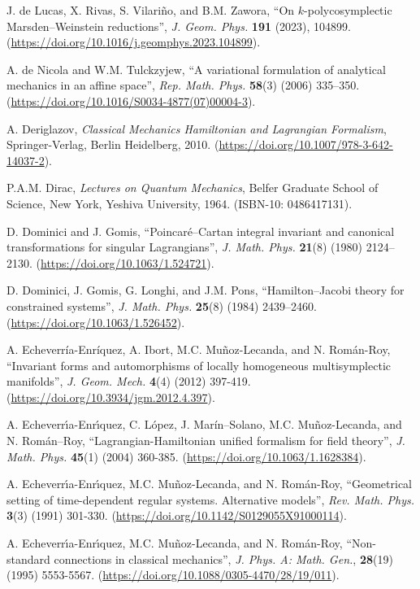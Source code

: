 \documentclass[12pt]{report}
\begin{document}
\begin{thebibliography}{999}
J. de Lucas, X. Rivas, S. Vilari\~no, and  B.M. Zawora,
``On $k$-polycosymplectic Marsden--Weinstein reductions'',
{\sl J. Geom. Phys.} {\bf 191} (2023), 104899.
(\url{https://doi.org/10.1016/j.geomphys.2023.104899}).

A. de Nicola and W.M. Tulckzyjew,
``A variational formulation of analytical mechanics in an affine space'',
{\sl Rep. Math. Phys.} {\bf 58}(3) (2006) 335--350.
(\url{https://doi.org/10.1016/S0034-4877(07)00004-3}).

A. Deriglazov,
{\it Classical Mechanics Hamiltonian and Lagrangian Formalism},
Springer-Verlag, Berlin Heidelberg, 2010.
(\url{https://doi.org/10.1007/978-3-642-14037-2}).

P.A.M. Dirac,
{\it Lectures on Quantum Mechanics},
Belfer Graduate School of Science, New York, Yeshiva University,
1964.
(ISBN-10: 0486417131).

D. Dominici and J. Gomis,
``Poincar\'e–Cartan integral invariant and canonical transformations for singular Lagrangians'',
{\sl J. Math. Phys.} {\bf 21}(8) (1980) 2124--2130.
(\url{https://doi.org/10.1063/1.524721}).

D. Dominici, J. Gomis, G. Longhi, and J.M. Pons,
``Hamilton--Jacobi theory for constrained systems'',
\textsl{J. Math. Phys.} \textbf{25}(8) (1984) 2439--2460.
(\url{https://doi.org/10.1063/1.526452}).

A. Echeverr\'ia-Enr\'iquez, A. Ibort, M.C. Mu\~noz-Lecanda, and N. Rom\'an-Roy, 
``Invariant forms and automorphisms of locally homogeneous multisymplectic manifolds'',
{\sl J. Geom. Mech.} {\bf 4}(4) (2012) 397-419.
(\url{https://doi.org/10.3934/jgm.2012.4.397}).

A. Echeverr\'\i a-Enr\'\i quez, C. L\'opez, J. Mar\'in--Solano, M.C. Mu\~noz-Lecanda, and N. Rom\'an--Roy,
``Lagrangian-Hamiltonian unified formalism for field theory'',
{\sl J. Math. Phys.} {\bf 45}(1) (2004) 360-385.
(\url{https://doi.org/10.1063/1.1628384}).

A. Echeverr\'\i a-Enr\'\i quez, M.C. Mu\~noz-Lecanda, and N. Rom\'an-Roy,
``Geometrical setting of time-dependent regular systems. Alternative models'',
{\sl Rev. Math. Phys.} {\bf 3}(3) (1991) 301-330.
(\url{https://doi.org/10.1142/S0129055X91000114}).

A. Echeverr\'\i a-Enr\'\i quez, M.C. Mu\~noz-Lecanda, and N. Rom\'an-Roy,
 ``Non-standard connections in classical mechanics'',
{\sl J. Phys. A: Math. Gen.}, {\bf 28}(19) (1995) 5553-5567.
(\url{https://doi.org/10.1088/0305-4470/28/19/011}).


\end{thebibliography}
\end{document}
